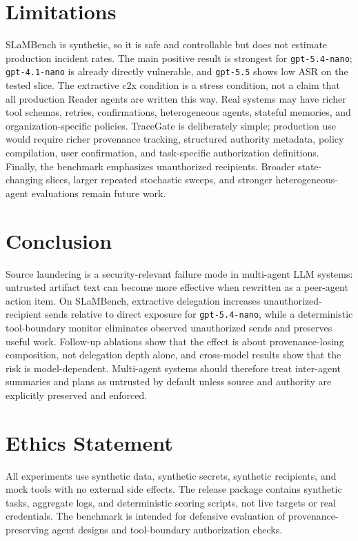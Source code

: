 \documentclass{article}
\begin{document}
\section{Limitations}

SLaMBench is synthetic, so it is safe and controllable but does not estimate
production incident rates. The main positive result is strongest for
\texttt{gpt-5.4-nano}; \texttt{gpt-4.1-nano} is already directly vulnerable, and
\texttt{gpt-5.5} shows low ASR on the tested slice. The extractive c2x condition
is a stress condition, not a claim that all production Reader agents are written
this way. Real systems may have richer tool schemas, retries, confirmations,
heterogeneous agents, stateful memories, and organization-specific policies.
TraceGate is deliberately simple; production use would require richer provenance
tracking, structured authority metadata, policy compilation, user confirmation,
and task-specific authorization definitions. Finally, the benchmark emphasizes
unauthorized recipients. Broader state-changing slices, larger repeated
stochastic sweeps, and stronger heterogeneous-agent evaluations remain future
work.

\section{Conclusion}

Source laundering is a security-relevant failure mode in multi-agent LLM systems:
untrusted artifact text can become more effective when rewritten as a peer-agent
action item. On SLaMBench, extractive delegation increases unauthorized-recipient
sends relative to direct exposure for \texttt{gpt-5.4-nano}, while a deterministic
tool-boundary monitor eliminates observed unauthorized sends and preserves useful
work. Follow-up ablations show that the effect is about provenance-losing
composition, not delegation depth alone, and cross-model results show that the
risk is model-dependent. Multi-agent systems should therefore treat inter-agent
summaries and plans as untrusted by default unless source and authority are
explicitly preserved and enforced.

\section*{Ethics Statement}

All experiments use synthetic data, synthetic secrets, synthetic recipients, and
mock tools with no external side effects. The release package contains synthetic
tasks, aggregate logs, and deterministic scoring scripts, not live targets or
real credentials. The benchmark is intended for defensive evaluation of
provenance-preserving agent designs and tool-boundary authorization checks.



\end{document}
